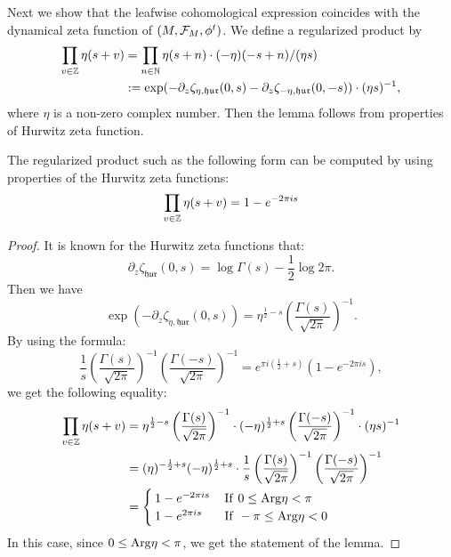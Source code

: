 Next we show that the leafwise cohomological expression coincides with the dynamical zeta function of $(M,{\mathcal{F}}_{M},\phi^{t})$. We define a regularized product by 
\begin{equation*}
    \begin{split}
    \prod_{v\in{\mathbb{Z}}}\eta(s+v)&=\prod_{n\in{\mathbb{N}}}\eta(s+n)\cdot(-\eta)(-s+n)/(\eta{s})\\
    &:=\exp(-\partial_{z}\zeta_{\eta,\mathfrak{hur}}(0,s)-\partial_{z}\zeta_{-\eta,\mathfrak{hur}}(0,-s))\cdot(\eta{s})^{-1},
    \end{split}
\end{equation*}
where $\eta$ is a non-zero complex number. Then the lemma follows from properties of Hurwitz zeta function.
\begin{lemma}
\label{lem:3.2}
The regularized product such as the following form can be computed by using properties of the Hurwitz zeta functions:
\begin{equation*}
    \prod_{v\in{\mathbb{Z}}}\eta(s+v)=1-e^{-2\pi{i}s}
\end{equation*}
\end{lemma}
\begin{proof}
It is known for the Hurwitz zeta functions that:
\begin{equation*}
    \partial_{z}\zeta_{\mathfrak{hur}}(0,s)=\log\Gamma(s)-\frac{1}{2}\log2\pi.
\end{equation*}
Then we have
\begin{equation*}
    \exp(-\partial_{z}\zeta_{\eta,\mathfrak{hur}}(0,s))=\eta^{\frac{1}{2}-s}\left( \frac{\Gamma(s)}{\sqrt{2\pi}} \right)^{-1}.
\end{equation*}
By using the formula:
\begin{equation*}
    \frac{1}{s}\left( \frac{\Gamma(s)}{\sqrt{2\pi}} \right)^{-1}\left( \frac{\Gamma(-s)}{\sqrt{2\pi}} \right)^{-1}=e^{\pi{i}(\frac{1}{2}+s)}(1-e^{-2\pi{i}{s}}),
\end{equation*}
we get the following equality:
\begin{equation*}
    \begin{split}
        \prod_{v\in{\mathbb{Z}}}\eta(s+v)&=\eta^{\frac{1}{2}-s}\left( \frac{\Gamma(s)}{\sqrt{2\pi}} \right)^{-1}\cdot(-\eta)^{\frac{1}{2}+s}\left( \frac{\Gamma(-s)}{\sqrt{2\pi}} \right)^{-1}\cdot(\eta{s})^{-1}\\
        &=(\eta)^{-\frac{1}{2}+s}(-\eta)^{\frac{1}{2}+s}\cdot\frac{1}{s}\left( \frac{\Gamma(s)}{\sqrt{2\pi}} \right)^{-1}\left( \frac{\Gamma(-s)}{\sqrt{2\pi}} \right)^{-1}\\
        &=\begin{cases}
        1-e^{-2\pi{i}{s}}&\,\mathrm{If}\,\,0\leq{\mathrm{Arg}}{\eta}<\pi\\
        1-e^{2\pi{i}{s}}&\,\mathrm{If}\,\,-\pi\leq{\mathrm{Arg}}{\eta}<0
        \end{cases}
    \end{split}
\end{equation*}
In this case, since $0\leq{\mathrm{Arg}}{\eta}<\pi$, we get the statement of the lemma.
\end{proof}
